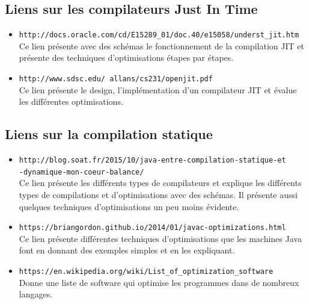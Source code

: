 \documentclass[a4paper]{article}
\begin{document}
\subsection{Liens sur les compilateurs Just In Time}
\begin{itemize}
\item \texttt{http://docs.oracle.com/cd/E15289\_01/doc.40/e15058/underst\_jit.htm} \\
Ce lien présente avec des schémas le fonctionnement de la compilation JIT et présente des techniques d'optimisations étapes par étapes.\\

\item \texttt{http://www.sdsc.edu/~allans/cs231/openjit.pdf} \\
Ce lien présente le design, l'implémentation d'un compilateur JIT et évalue les différentes optimisations.\\
     \end{itemize}

\subsection{Liens sur la compilation statique}
\begin{itemize}
\item \texttt{http://blog.soat.fr/2015/10/java-entre-compilation-statique-et\\-dynamique-mon-coeur-balance/} \\
Ce lien présente les différents types de compilateurs et explique les différents types de compilations et d'optimisations avec des schémas. Il présente aussi quelques techniques d'optimisations un peu moins évidente.\\

\item \texttt{https://briangordon.github.io/2014/01/javac-optimizations.html} \\
Ce lien présente différentes techniques d'optimisations que les machines Java font en donnant des exemples simples et en les expliquant.\\

\item \texttt{https://en.wikipedia.org/wiki/List\_of\_optimization\_software} \\
Donne une liste de software qui optimise les programmes dans de nombreux langages.\\
     \end{itemize}
\end{document}
